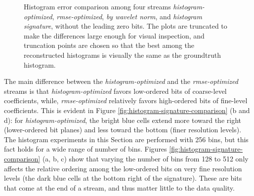 \begin{figure}[h]
	\caption{Histogram error comparison among four streams \emph{histogram-optimized},
	\emph{rmse-optimized}, \emph{by wavelet norm}, and \emph{histogram signature}, without the leading
	zero bits. The plots are truncated to make the differences large enough for visual inspection, and
	truncation points are chosen so that the best among the reconstructed histograms is visually the
	same as the groundtruth histogram. }
	\label{fig:histogram-stream-comparison}
\end{figure}


The main difference between the \emph{histogram-optimized} and the \emph{rmse-optimized} streams is
that \emph{histogram-optimized} favors low-ordered bits of coarse-level coefficients, while,
\emph{rmse-optimized} relatively favors high-ordered bits of fine-level coefficients. This is
evident in Figure \ref{fig:histogram-signature-comparison} (b and d): for
\emph{histogram-optimized}, the bright blue cells extend more toward the right (lower-ordered bit
planes) and less toward the bottom (finer resolution levels). The histogram experiments in this
Section are performed with 256 bins, but this fact holds for a wide range of number of bins. Figures
\ref{fig:histogram-signature-comparison} (a, b, c) show that varying the number of bins from 128 to
512 only affects the relative ordering among the low-ordered bits on very fine resolution levels
(the dark blue cells at the bottom right of the signature). These are bits that come at the end of a
stream, and thus matter little to the data quality. 

